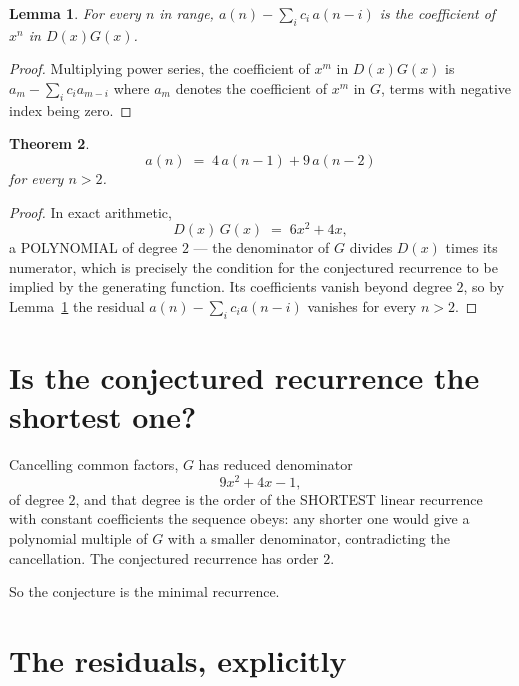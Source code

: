 \documentclass[11pt,a4paper]{article}
\theoremstyle{plain}
\newtheorem{theorem}{Theorem}
\newtheorem{lemma}[theorem]{Lemma}
\theoremstyle{definition}
\begin{document}
\begin{lemma}\label{lem:key}
For every $n$ in range, $a(n)-\sum_i c_i\,a(n-i)$ is the coefficient of $x^{n}$ in
$D(x)G(x)$.
\end{lemma}

\begin{proof}
Multiplying power series, the coefficient of $x^{m}$ in $D(x)G(x)$ is
$a_m-\sum_i c_i a_{m-i}$ where $a_m$ denotes the coefficient of $x^{m}$ in $G$, terms with
negative index being zero.
\end{proof}

\begin{theorem}
\[
a(n)\;=\;4\,a(n-1) + 9\,a(n-2)
\]
for every $n>2$.
\end{theorem}

\begin{proof}
In exact arithmetic,
\[
D(x)\,G(x)\;=\;6 x^{2} + 4 x,
\]
a POLYNOMIAL of degree $2$ --- the denominator of $G$ divides $D(x)$ times its numerator,
which is precisely the condition for the conjectured recurrence to be implied by the
generating function. Its coefficients vanish beyond degree $2$, so by
Lemma~\ref{lem:key} the residual $a(n)-\sum_ic_ia(n-i)$ vanishes for every
$n>2$.
\end{proof}

\section{Is the conjectured recurrence the shortest one?}

Cancelling common factors, $G$ has reduced denominator
\[
9 x^{2} + 4 x - 1,
\]
of degree $2$, and that degree is the order of the SHORTEST linear recurrence with
constant coefficients the sequence obeys: any shorter one would give a polynomial multiple of
$G$ with a smaller denominator, contradicting the cancellation. The conjectured recurrence has
order $2$.

So the conjecture is the minimal recurrence.

\section{The residuals, explicitly}
\end{document}
